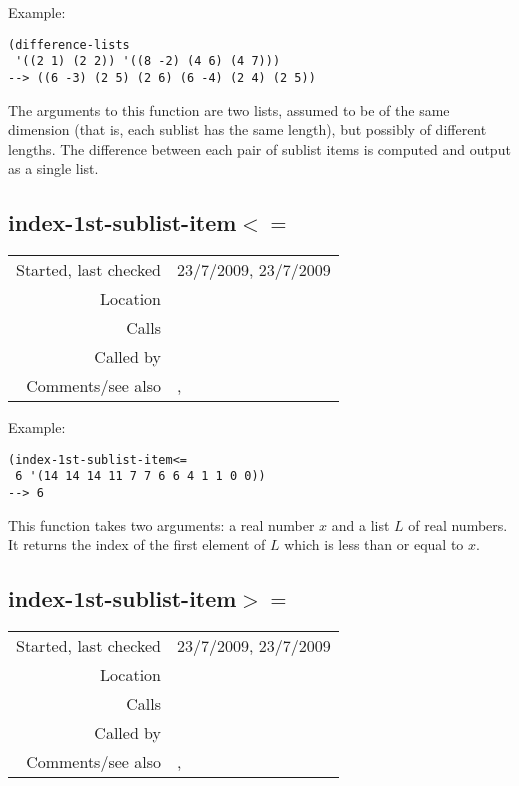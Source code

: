 \vspace{0.5cm}
\noindent Example:
\begin{verbatim}
(difference-lists
 '((2 1) (2 2)) '((8 -2) (4 6) (4 7)))
--> ((6 -3) (2 5) (2 6) (6 -4) (2 4) (2 5))
\end{verbatim}

\noindent The arguments to this function are two
lists, assumed to be of the same dimension (that is,
each sublist has the same length), but possibly of
different lengths. The difference between each pair of
sublist items is computed and output as a single list.


\subsection*{index-1st-sublist-item$<=$}\label{fun:index-1st-sublist-item<=}

\vspace{0.3cm}
\begin{tabular}{r|p{8cm}}
Started, last checked & 23/7/2009, 23/7/2009 \\
Location & \nameref{sec:projection} \\
Calls & \\
Called by & \nameref{fun:test-equal<subset} \\
Comments/see also & \nameref{fun:index-nth-sublist-item<=},\newline \nameref{fun:index-1st-sublist-item<}
\end{tabular}

\vspace{0.5cm}
\noindent Example:
\begin{verbatim}
(index-1st-sublist-item<=
 6 '(14 14 14 11 7 7 6 6 4 1 1 0 0))
--> 6
\end{verbatim}

\noindent This function takes two arguments: a real
number $x$ and a list $L$ of real numbers. It returns
the index of the first element of $L$ which is less
than or equal to $x$.


\subsection*{index-1st-sublist-item$>=$}\label{fun:index-1st-sublist-item>=}

\vspace{0.3cm}
\begin{tabular}{r|p{8cm}}
Started, last checked & 23/7/2009, 23/7/2009 \\
Location & \nameref{sec:projection} \\
Calls & \\
Called by & \nameref{fun:test-equal<subset} \\
Comments/see also & \nameref{fun:index-nth-sublist-item>=},\newline \nameref{fun:index-1st-sublist-item>}
\end{tabular}


